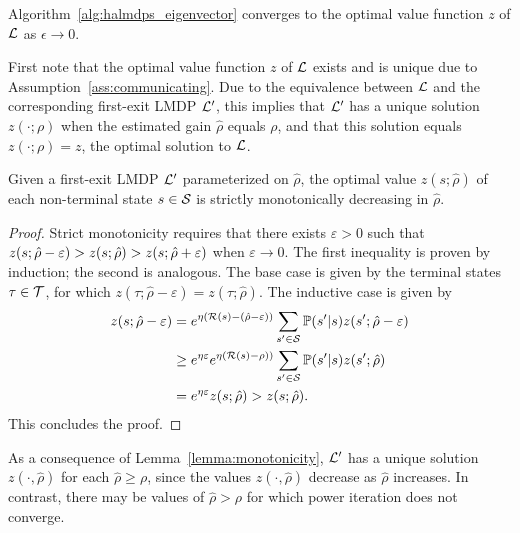 \begin{theorem}\label{thm:converge}
    Algorithm~\ref{alg:halmdps_eigenvector} converges to the optimal value function $z$ of $\mathcal{L}$ as $\epsilon\to 0$.
\end{theorem}

First note that the optimal value function $z$ of $\mathcal{L}$ exists and is unique due to Assumption~\ref{ass:communicating}. Due to the equivalence between $\mathcal{L}$ and the corresponding first-exit LMDP $\mathcal{L}'$, this implies that $\mathcal{L}'$ has a unique solution $z(\cdot;\rho)$ when the estimated gain $\hat\rho$ equals $\rho$, and that this solution equals $z(\cdot;\rho)=z$, the optimal solution to $\mathcal{L}$.

\begin{lemma}\label{lemma:monotonicity}
     Given a first-exit LMDP $\mathcal{L}'$ parameterized on $\hat\rho$, the optimal value $z(s;\hat\rho)$ of each non-terminal state $s\in\mathcal{S}$ is strictly monotonically decreasing in $\hat\rho$.
\end{lemma}

\begin{proof}
Strict monotonicity requires that there exists $\varepsilon>0$ such that $\linebreak{z(s;\hat\rho - \varepsilon) > z(s;\hat\rho) > z(s;\hat\rho+\varepsilon)}$ when $\varepsilon\rightarrow 0$. The first inequality is proven by induction; the second is analogous. The base case is given by the terminal states $\tau\in\mathcal{T}$, for which $z(\tau;\hat\rho - \varepsilon) = z(\tau;\hat\rho)$. The inductive case is given by
\begin{align*}
    z(s;\hat\rho-\varepsilon) &= e^{\eta(\mathcal{R}(s) - (\hat\rho -\varepsilon))}\sum_{s'\in\mathcal{S}}\mathbb{P}(s'\lvert s) z(s';\hat\rho- \varepsilon)\\
      &\geq e^{\eta\varepsilon} e^{\eta(\mathcal{R}(s) - \rho))}\sum_{s'\in\mathcal{S}}\mathbb{P}(s'\lvert s) z(s';\hat\rho)\\
      &= e^{\eta\varepsilon} z(s;\hat\rho) > z(s;\hat\rho).
\end{align*}
This concludes the proof.
\end{proof}

As a consequence of Lemma~\ref{lemma:monotonicity}, $\mathcal{L}'$ has a unique solution $z(\cdot,\hat\rho)$ for each $\hat\rho\geq\rho$, since the values $z(\cdot,\hat\rho)$ decrease as $\hat\rho$ increases. In contrast, there may be values of $\hat\rho>\rho$ for which power iteration does not converge.

